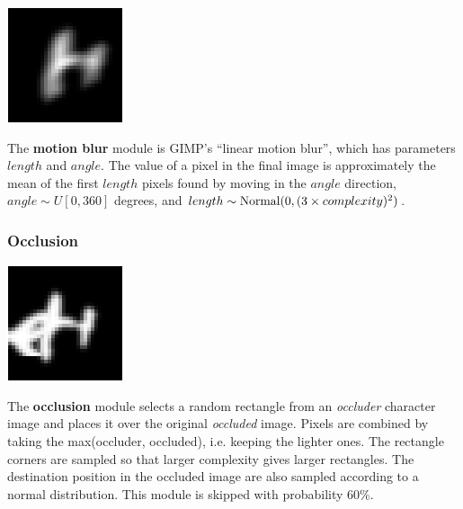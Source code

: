 \documentclass{article} %
\begin{document}
\begin{minipage}[t]{0.14\linewidth}
\centering
\vspace*{0mm}
\includegraphics[scale=.4]{images/Motionblur_only.png}
\end{minipage}%
\hspace{0.3cm}\begin{minipage}[t]{0.83\linewidth}
\vspace*{2mm}
The {\bf motion blur} module is GIMP's ``linear motion blur'', which
has parameters $length$ and $angle$. The value of
a pixel in the final image is approximately the  mean of the first $length$ pixels
found by moving in the $angle$ direction,
$angle \sim U[0,360]$ degrees, and $length \sim {\rm Normal}(0,(3 \times complexity)^2)$.
\end{minipage}


\subsubsection*{Occlusion}

\begin{minipage}[t]{0.14\linewidth}
\centering
\vspace*{3mm}
\includegraphics[scale=.4]{images/occlusion_only.png}\\
\end{minipage}%
\hspace{0.3cm}\begin{minipage}[t]{0.83\linewidth}
The {\bf occlusion} module selects a random rectangle from an {\em occluder} character
image and places it over the original {\em occluded}
image. Pixels are combined by taking the max(occluder, occluded),
i.e. keeping the lighter ones.
The rectangle corners
are sampled so that larger complexity gives larger rectangles.
The destination position in the occluded image are also sampled
according to a normal distribution.
This module is skipped with probability 60\%.
\end{minipage}
\end{document}
